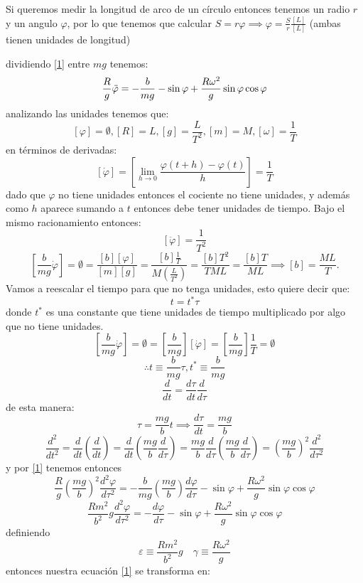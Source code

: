 \begin{tcolorbox}[colback=Black!4,colframe=White] 
\begin{nota}
  Si queremos medir la longitud de arco de un círculo entonces tenemos un radio $r$ y un angulo  $\varphi$, por lo que tenemos que calcular $S=r\varphi \implies \varphi=\frac{S}{r} \frac{[L]}{[L]}$ (ambas tienen unidades de longitud)
\end{nota}
\end{tcolorbox}
dividiendo \eqref{1} entre $mg$ tenemos:
 $$
  \frac{R}{g}\ddot{{\varphi}} = -\frac{b}{mg}-\sin\varphi + \frac{R\omega^2}{g}\sin\varphi\cos\varphi\\
$$
analizando las unidades tenemos que: $$
[\varphi]= \emptyset, [R]=L, [g]=\frac{L}{T^2}, [m]=M, [\omega]=\frac{1}{T}
$$
en términos de derivadas:
$$
 [\dot{{\varphi}}] = \left[ \lim_{h \to 0} \frac{\varphi(t+h)-\varphi(t)}{h} \right] = \frac{1}{T} 
$$
dado que $\varphi$ no tiene unidades entonces el cociente no tiene unidades, y además como $h$ aparece sumando a $t$ entonces debe tener unidades de tiempo. Bajo el mismo racionamiento entonces:
 $$
 [\ddot{{\varphi}}] =\frac{1}{T^2}
$$
 $$
 \left[ \frac{b}{mg}\dot{{\varphi}} \right] = \emptyset = \frac{[b][\varphi]}{[m][g]}=\frac{[b]\frac{1}{T}}{M(\frac{L}{T^2})}= \frac{[b]T^2}{TML} = \frac{[b]T}{ML} \implies [b] = \frac{ML}{T}
.$$
Vamos a reescalar el tiempo para que no tenga unidades, esto quiere decir que:
 $$
t=t^{*} \tau
$$
donde $t^{*}$ es una constante que tiene unidades de tiempo multiplicado por algo que no tiene unidades.
$$
\left[ \frac{b}{mg} \dot{\varphi} \right] = \emptyset = \left[ \frac{b}{mg}\right][ \dot{\varphi}  ] = \left[ \frac{b}{mg} \right] \frac{1}{T}= \emptyset
$$
 $$
\therefore t \equiv \frac{b}{mg} \tau, t^{*} \equiv \frac{b}{mg} 
$$
 $$
\frac{d}{dt}=\frac{d\tau}{dt}\frac{d}{d\tau}
$$
de esta manera:
$$
\tau=\frac{mg}{b}t \implies \frac{d\tau}{dt}=\frac{mg}{b}
$$
$$
\frac{d^2}{dt^2}=\frac{d}{dt}\left( \frac{d}{dt} \right) = \frac{d}{dt}\left( \frac{mg}{b} \frac{d}{d\tau} \right) = \frac{mg}{b}\frac{d}{d\tau} \left( \frac{mg}{b}\frac{d}{d\tau} \right)  =\left( \frac{mg}{b} \right)^2 \frac{d^2}{d\tau^2} 
$$
y por \eqref{1} tenemos entonces
 $$
\frac{R}{g} \left( \frac{mg}{b} \right) ^2 \frac{d^2\varphi}{d\tau^2} = -\frac{b}{mg} \left( \frac{mg}{b} \right) \frac{d\varphi}{d\tau}-\sin\varphi+ \frac{R\omega^2}{g}\sin\varphi\cos\varphi
$$
 $$
 \frac{Rm^2}{b^2}g \frac{d^2\varphi}{d\tau^2}=-\frac{d\varphi}{d\tau}-\sin\varphi+\frac{R\omega^2}{g}\sin\varphi\cos\varphi
$$
definiendo
 $$
\varepsilon \equiv \frac{Rm^2}{b^2}g \quad \gamma \equiv \frac{R\omega^2}{g}
$$
entonces nuestra ecuación \eqref{1} se transforma en:

